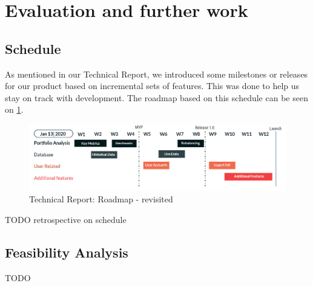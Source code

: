 \documentclass[main.tex]{subfiles}
\begin{document}
\section{Evaluation and further work}
\subsection{Schedule}
As mentioned in our Technical Report, we introduced some milestones or releases for our product based on incremental sets of features. This was done to help us stay on track with development. The roadmap based on this schedule can be seen on \figurename{\ref{Roadmap}}.

\begin{figure}[H]
   \centering
   \includegraphics[width=\textwidth]{05Coding/05Pictures/initial_roadmap.jpg}
   \caption{Technical Report: Roadmap - revisited}
   \label{Roadmap}
\end{figure}

TODO retrospective on schedule

\subsection{Feasibility Analysis}
TODO
\end{document}
